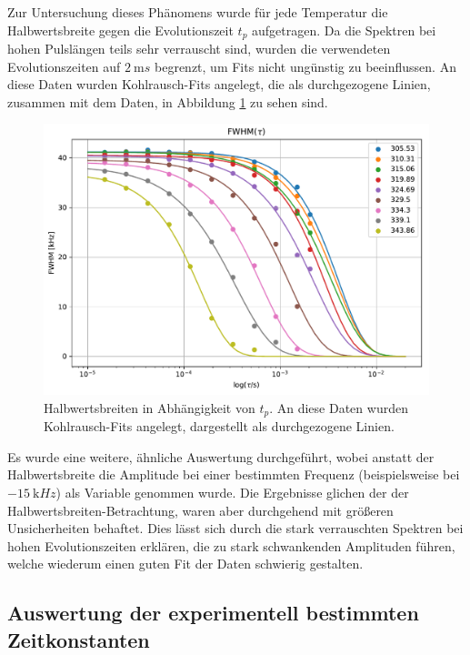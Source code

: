 Zur Untersuchung dieses Phänomens wurde für jede Temperatur die Halbwertsbreite gegen die Evolutionszeit $t_p$ aufgetragen. Da die Spektren bei hohen Pulslängen teils sehr verrauscht sind, wurden die verwendeten Evolutionszeiten auf $\SI{2}{\milli s}$ begrenzt, um Fits nicht ungünstig zu beeinflussen. An diese Daten wurden Kohlrausch-Fits angelegt, die als durchgezogene Linien, zusammen mit dem Daten, in Abbildung \ref{fig:res:spekdyn_fits} zu sehen sind.
\begin{figure}
	\begin{center}
		\includegraphics[width=.9\textwidth]{graphics/plots/SPEKDYN/spekdyn_fits.pdf}
	\end{center}
	\caption{Halbwertsbreiten in Abhängigkeit von $t_p$. An diese Daten wurden Kohlrausch-Fits angelegt, dargestellt als durchgezogene Linien.} \label{fig:res:spekdyn_fits}
\end{figure}

Es wurde eine weitere, ähnliche Auswertung durchgeführt, wobei anstatt der Halbwertsbreite die Amplitude bei einer bestimmten Frequenz (beispielsweise bei $\SI{-15}{\kilo Hz}$) als Variable genommen wurde. Die Ergebnisse glichen der der Halbwertsbreiten-Betrachtung, waren aber durchgehend mit größeren Unsicherheiten behaftet. Dies lässt sich durch die stark verrauschten Spektren bei hohen Evolutionszeiten erklären, die zu stark schwankenden Amplituden führen, welche wiederum einen guten Fit der Daten schwierig gestalten.



\subsection{Auswertung der experimentell bestimmten Zeitkonstanten} \label{section:res:dynausw}

